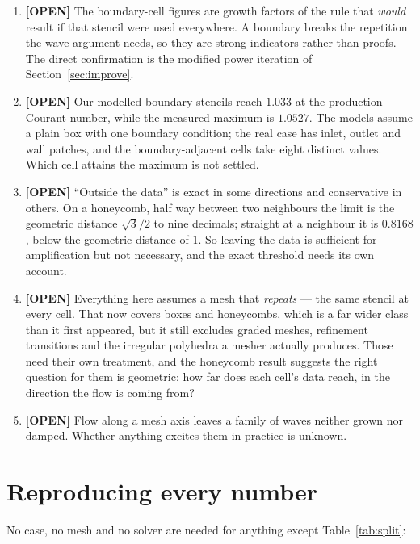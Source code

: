 \documentclass[11pt,a4paper]{article}
\newcommand{\opn}{\textcolor{orange!80!black}{\textbf{[OPEN]}}}
\begin{document}
\begin{enumerate}
\item \opn{} The boundary-cell figures are growth factors of the rule that \emph{would} result
      if that stencil were used everywhere. A boundary breaks the repetition the wave argument
      needs, so they are strong indicators rather than proofs. The direct confirmation is the
      modified power iteration of Section~\ref{sec:improve}.
\item \opn{} Our modelled boundary stencils reach $1.033$ at the production Courant number,
      while the measured maximum is $1.0527$. The models assume a plain box with one boundary
      condition; the real case has inlet, outlet and wall patches, and the boundary-adjacent
      cells take eight distinct values. Which cell attains the maximum is not settled.
\item \opn{} ``Outside the data'' is exact in some directions and conservative in others. On a
      honeycomb, half way between two neighbours the limit is the geometric distance
      $\sqrt3/2$ to nine decimals; straight at a neighbour it is $0.8168$, below the geometric
      distance of $1$. So leaving the data is sufficient for amplification but not necessary,
      and the exact threshold needs its own account.
\item \opn{} Everything here assumes a mesh that \emph{repeats} --- the same stencil at every
      cell. That now covers boxes and honeycombs, which is a far wider class than it first
      appeared, but it still excludes graded meshes, refinement transitions and the irregular
      polyhedra a mesher actually produces. Those need their own treatment, and the honeycomb
      result suggests the right question for them is geometric: how far does each cell's data
      reach, in the direction the flow is coming from?
\item \opn{} Flow along a mesh axis leaves a family of waves neither grown nor damped. Whether
      anything excites them in practice is unknown.
\end{enumerate}

\section{Reproducing every number}

No case, no mesh and no solver are needed for anything except Table~\ref{tab:split}:
\end{document}
